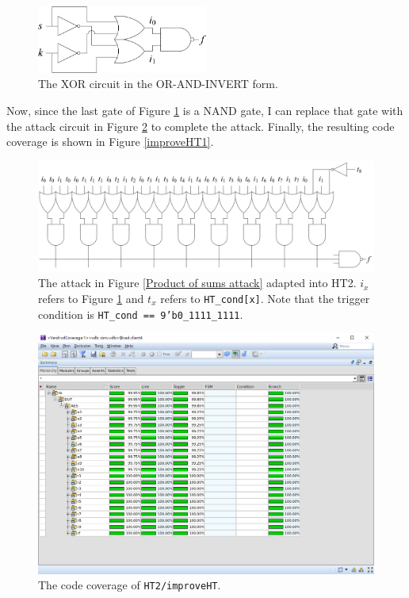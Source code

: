\documentclass{article}
\begin{document}
\begin{figure}[htp] \centering
\includegraphics[width=0.5\textwidth]{XOR_OAI}
\caption{The XOR circuit in the OR-AND-INVERT form.}
\label{XOR_OAI}
\end{figure}

Now, since the last gate of Figure \ref{XOR_OAI} is a NAND gate, I can replace that gate with the attack circuit in Figure \ref{improvedHT2} to complete the attack. Finally, the resulting code coverage is shown in Figure \ref{improveHT1}.

\begin{figure}[htp] \centering
\includegraphics[width=\textwidth]{improvedHT2}
\caption{The attack in Figure \ref{Product of sums attack} adapted into HT2. $i_x$ refers to Figure \ref{XOR_OAI} and $t_x$ refers to \texttt{HT\_cond[x]}. Note that the trigger condition is \texttt{HT\_cond == 9'b0\_1111\_1111}.}
\label{improvedHT2}
\end{figure}

\begin{figure}[htp] \centering
\includegraphics[width=\textwidth]{improveHT2}
\caption{The code coverage of \texttt{HT2/improveHT}.}
\label{improveHT2}
\end{figure}
\end{document}
